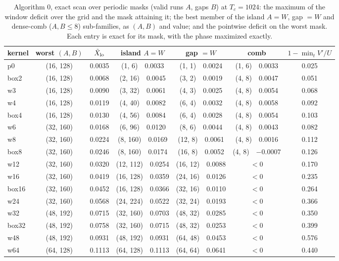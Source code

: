 \documentclass{article}
\numberwithin{equation}{section}   %
\begin{document}
\begin{table}[ht]
\centering\small
\begin{tabular}{l c c c c c c}
\toprule
kernel & worst $(A, B)$ & $\tilde X_{\rm lo}$ & island $A = W$ & gap $= W$ & comb & $1 - \min_t V'/U$ \\
\midrule
p0    & (16, 128) & 0.0035 & (1, 6)\ \ 0.0033    & (1, 1)\ \ 0.0024   & (1, 6)\ \ 0.0033 & 0.025 \\
box2  & (16, 128) & 0.0068 & (2, 16)\ \ 0.0045   & (3, 2)\ \ 0.0019   & (4, 8)\ \ 0.0047 & 0.051 \\
w3    & (16, 128) & 0.0090 & (3, 32)\ \ 0.0061   & (4, 3)\ \ 0.0025   & (4, 8)\ \ 0.0054 & 0.068 \\
w4    & (16, 128) & 0.0119 & (4, 40)\ \ 0.0082   & (6, 4)\ \ 0.0032   & (4, 8)\ \ 0.0058 & 0.092 \\
box4  & (16, 128) & 0.0130 & (4, 56)\ \ 0.0084   & (6, 4)\ \ 0.0028   & (4, 8)\ \ 0.0054 & 0.103 \\
w6    & (32, 160) & 0.0168 & (6, 96)\ \ 0.0120   & (8, 6)\ \ 0.0044   & (4, 8)\ \ 0.0043 & 0.082 \\
w8    & (32, 160) & 0.0224 & (8, 160)\ \ 0.0169  & (12, 8)\ \ 0.0061  & (4, 8)\ \ 0.0016 & 0.112 \\
box8  & (32, 160) & 0.0246 & (8, 160)\ \ 0.0174  & (16, 8)\ \ 0.0052  & (4, 8)\ \ $-0.0007$ & 0.126 \\
w12   & (32, 160) & 0.0320 & (12, 112)\ \ 0.0254 & (16, 12)\ \ 0.0088 & $< 0$ & 0.170 \\
w16   & (32, 160) & 0.0419 & (16, 128)\ \ 0.0359 & (24, 16)\ \ 0.0126 & $< 0$ & 0.235 \\
box16 & (32, 160) & 0.0452 & (16, 128)\ \ 0.0366 & (32, 16)\ \ 0.0110 & $< 0$ & 0.264 \\
w24   & (32, 160) & 0.0568 & (24, 224)\ \ 0.0522 & (32, 24)\ \ 0.0193 & $< 0$ & 0.366 \\
w32   & (48, 192) & 0.0715 & (32, 160)\ \ 0.0703 & (48, 32)\ \ 0.0285 & $< 0$ & 0.350 \\
box32 & (48, 192) & 0.0758 & (32, 160)\ \ 0.0715 & (48, 32)\ \ 0.0253 & $< 0$ & 0.399 \\
w48   & (48, 192) & 0.0931 & (48, 192)\ \ 0.0931 & (64, 48)\ \ 0.0453 & $< 0$ & 0.576 \\
w64   & (64, 128) & 0.1113 & (64, 128)\ \ 0.1113 & (64, 64)\ \ 0.0641 & $< 0$ & 0.440 \\
\bottomrule
\end{tabular}
\caption{Algorithm 0, exact scan over periodic masks (valid runs $A$, gaps $B$) at $T_c = 1024$: the
maximum of the window deficit over the grid and the mask attaining it; the best member of the island
$A = W$, gap $= W$ and dense-comb ($A, B \le 8$) sub-families, as $(A, B)$ and value; and the pointwise
deficit on the worst mask.  Each entry is exact for its mask, with the phase maximized exactly.}
\label{tab:ip_fom_scan0}
\end{table}
\end{document}
